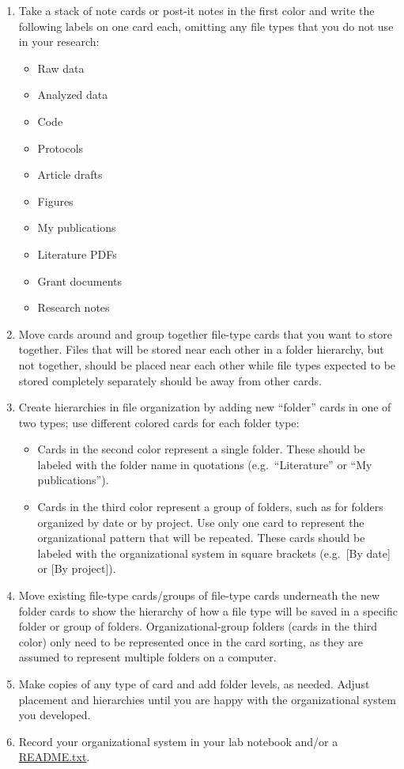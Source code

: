 \documentclass[
]{book}
\providecommand{\tightlist}{%
  \setlength{\itemsep}{0pt}\setlength{\parskip}{0pt}}
\begin{document}
\begin{enumerate}
\def\labelenumi{\arabic{enumi}.}
\tightlist
\item
  Take a stack of note cards or post-it notes in the first color and write the following labels on one card each, omitting any file types that you do not use in your research:

  \begin{itemize}
  \tightlist
  \item
    Raw data
  \item
    Analyzed data
  \item
    Code
  \item
    Protocols
  \item
    Article drafts
  \item
    Figures
  \item
    My publications
  \item
    Literature PDFs
  \item
    Grant documents
  \item
    Research notes
  \end{itemize}
\item
  Move cards around and group together file-type cards that you want to store together. Files that will be stored near each other in a folder hierarchy, but not together, should be placed near each other while file types expected to be stored completely separately should be away from other cards.
\item
  Create hierarchies in file organization by adding new ``folder'' cards in one of two types; use different colored cards for each folder type:

  \begin{itemize}
  \tightlist
  \item
    Cards in the second color represent a single folder. These should be labeled with the folder name in quotations (e.g.~``Literature'' or ``My publications'').
  \item
    Cards in the third color represent a group of folders, such as for folders organized by date or by project. Use only one card to represent the organizational pattern that will be repeated. These cards should be labeled with the organizational system in square brackets (e.g.~{[}By date{]} or {[}By project{]}).
  \end{itemize}
\item
  Move existing file-type cards/groups of file-type cards underneath the new folder cards to show the hierarchy of how a file type will be saved in a specific folder or group of folders. Organizational-group folders (cards in the third color) only need to be represented once in the card sorting, as they are assumed to represent multiple folders on a computer.
\item
  Make copies of any type of card and add folder levels, as needed. Adjust placement and hierarchies until you are happy with the organizational system you developed.
\item
  Record your organizational system in your lab notebook and/or a \protect\hyperlink{readme-txt}{README.txt}.
\end{enumerate}
\end{document}

